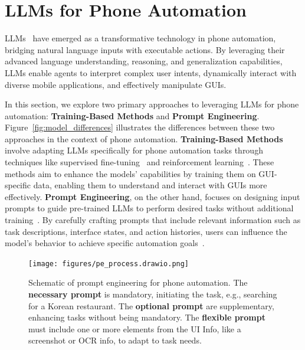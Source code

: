 \section{LLMs for Phone Automation}
\label{sec:models}

LLMs~\cite{radford2018gpt1,radford2019gpt2,brown2020gpt3,achiam2023gpt} have emerged as a transformative technology in phone automation, bridging natural language inputs with executable actions. By leveraging their advanced language understanding, reasoning, and generalization capabilities, LLMs enable agents to interpret complex user intents, dynamically interact with diverse mobile applications, and effectively manipulate GUIs.

In this section, we explore two primary approaches to leveraging LLMs for phone automation: \textbf{Training-Based Methods} and \textbf{Prompt Engineering}. Figure~\ref{fig:model_differences} illustrates the differences between these two approaches in the context of phone automation. \textbf{Training-Based Methods} involve adapting LLMs specifically for phone automation tasks through techniques like supervised fine-tuning~\cite{cheng2024seeclick, chen2024guicourse, lu2024guiodyssey, pawlowski2024tinyclick} and reinforcement learning~\cite{song2024trial, bai2024digirl, wang2024distrl}. These methods aim to enhance the models' capabilities by training them on GUI-specific data, enabling them to understand and interact with GUIs more effectively. \textbf{Prompt Engineering}, on the other hand, focuses on designing input prompts to guide pre-trained LLMs to perform desired tasks without additional training~\cite{wei2022chain, yao2024tree, chen2022program}. By carefully crafting prompts that include relevant information such as task descriptions, interface states, and action histories, users can influence the model's behavior to achieve specific automation goals~\cite{wen2023droidbot, zhang2023appagent, song2023navigating}.

\begin{figure}[ht]
    \centering
    \texttt{[image: figures/pe\_process.drawio.png]}
    \caption{
        Schematic of prompt engineering for phone automation. 
        The \textbf{\textcolor[RGB]{184,84,80}{necessary prompt}} is mandatory, initiating the task, e.g., searching for a Korean restaurant. 
        The \textbf{\textcolor[RGB]{130,179,102}{optional prompt}} are supplementary, enhancing tasks without being mandatory. 
        The \textbf{\textcolor[RGB]{14,128,139}{flexible prompt}} must include one or more elements from the UI Info, like a screenshot or OCR info, to adapt to task needs.
    }
    \label{fig:pe_process}
\end{figure}



